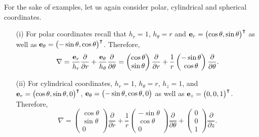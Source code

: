 {
\color{blue}
\bexample
For the sake of examples, let us again consider polar, cylindrical and spherical coordinates.
\begin{itemize}
\item[(i)]
For polar coordinates recall that $h_r=1$, $h_\theta=r$
and $
{\bf e}_r =
\begin{pmatrix}
\cos \theta , \sin \theta
\end{pmatrix}^\intercal
$ as well as $
{\bf e}_\theta
=
\begin{pmatrix}
- \sin \theta , \cos \theta
\end{pmatrix}^\intercal  $.
Therefore,
\begin{equation}
\nabla =
\frac{ {\bf e}_r }{ h_r } \frac{\partial}{\partial r}
+
\frac{ {\bf e}_\theta }{ h_\theta } \frac{\partial}{\partial \theta}
=
\begin{pmatrix}
\cos \theta \\ \sin \theta
\end{pmatrix}
\frac{\partial}{\partial r}
+
\frac{ 1 }{ r }
\begin{pmatrix}
- \sin \theta \\ \cos \theta
\end{pmatrix}
\frac{\partial}{\partial \theta}
.
\end{equation}

\item[(ii)]
For cylindrical coordinates,
$h_r=1$, $h_\theta=r$, $h_z=1$, and
$
{\bf e}_r =
\begin{pmatrix}
\cos \theta , \sin \theta ,0
\end{pmatrix}^\intercal
$, $
{\bf e}_\theta
=
\begin{pmatrix}
- \sin \theta , \cos \theta ,0
\end{pmatrix}$ as well as $
{\bf e}_z
=
\begin{pmatrix}
0,0,1
\end{pmatrix}^\intercal  $.
Therefore,
\begin{equation}
\nabla =
\begin{pmatrix}
\cos \theta \\ \sin \theta \\0
\end{pmatrix}
\frac{\partial}{\partial r}
+
\frac{ 1 }{ r }
\begin{pmatrix}
- \sin \theta \\ \cos \theta  \\0
\end{pmatrix}
\frac{\partial}{\partial \theta}
+
\begin{pmatrix}
0 \\ 0  \\1
\end{pmatrix}
\frac{\partial}{\partial z}
.
\end{equation}




\end{itemize}}
